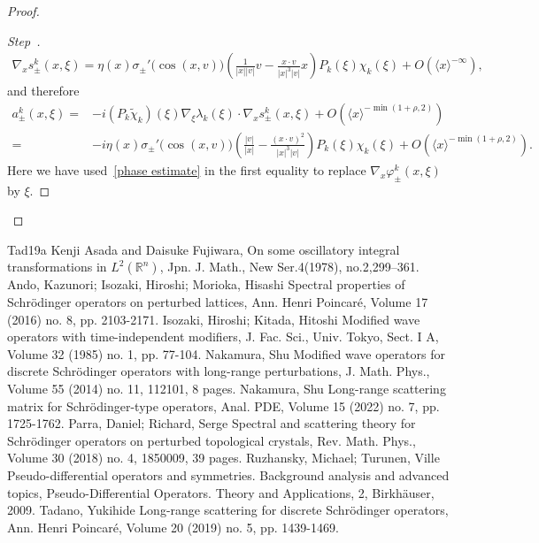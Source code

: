 \documentclass[10pt]{amsart}
\theoremstyle{definition}
\newenvironment{proofc}{\begin{proof}}{\end{proof}}
\numberwithin{equation}{section}
\newcommand{\f}{\varphi}
\newcommand{\x}{\xi}
\newcommand{\s}{\sigma}
\newcommand{\la}{\langle}
\newcommand{\ra}{\rangle}
\newcommand{\jap}[1]{\langle #1 \rangle}
\newcounter{stepcount}
\newenvironment{step}{\refstepcounter{stepcount}\begin{proof}[Step~\thestepcount]}{\let\qed\relax\end{proof}}
\begin{document}
\begin{proofc}
\begin{step}
\begin{align*}
\nabla_x s_\pm^k(x,\x) 
= \eta(x)\s_\pm'\bigl(\cos(x,v) \bigr) \left(\frac{1}{|x||v|}v - \frac{x\cdot v}{|x|^3|v|}x \right) P_k(\x) \chi_k(\x) +O\left(\jap{x}^{-\infty}\right),
\end{align*}
and therefore
\begin{align*}
a_\pm^k(x,\x) 
=& -i (P_k\tilde\chi_k)(\x)\nabla_\x \lambda_k(\x)\cdot\nabla_x s_\pm^k(x,\x) + O\left(\la x \ra^{-\min(1+\rho,2)}\right) \\
=& -i \eta(x)\s_\pm'\bigl(\cos(x,v) \bigr) \left(\frac{|v|}{|x|}-\frac{(x\cdot v)^2}{|x|^3|v|}\right) P_k(\x) \chi_k(\x) + O\left(\la x \ra^{-\min(1+\rho,2)}\right).
\end{align*}
Here we have used~\eqref{phase estimate} in the first equality to replace $\nabla_x\f_\pm^k(x,\x)$ by $\x$.\qedhere
\end{step}\let\qed\relax
\end{proofc}

\begin{thebibliography}{Tad19a}
 Kenji Asada and Daisuke Fujiwara, On some oscillatory integral transformations in $L^2(\mathbb{R}^n)$, Jpn. J. Math., New Ser.4(1978), no.2,299–361.
 Ando, Kazunori; Isozaki, Hiroshi; Morioka, Hisashi Spectral properties of Schrödinger operators on perturbed lattices, Ann. Henri Poincaré, Volume 17 (2016) no. 8, pp. 2103-2171.
 Isozaki, Hiroshi; Kitada, Hitoshi Modified wave operators with time-independent modifiers, J. Fac. Sci., Univ. Tokyo, Sect. I A, Volume 32 (1985) no. 1, pp. 77-104.
 Nakamura, Shu Modified wave operators for discrete Schrödinger operators with long-range perturbations, J. Math. Phys., Volume 55 (2014) no. 11, 112101, 8 pages.
 Nakamura, Shu Long-range scattering matrix for Schrödinger-type operators, Anal. PDE, Volume 15 (2022) no. 7, pp. 1725-1762.
 Parra, Daniel; Richard, Serge Spectral and scattering theory for Schrödinger operators on perturbed topological crystals, Rev. Math. Phys., Volume 30 (2018) no. 4, 1850009, 39 pages.
 Ruzhansky, Michael; Turunen, Ville Pseudo-differential operators and symmetries. Background analysis and advanced topics, Pseudo-Differential Operators. Theory and Applications, 2, Birkhäuser, 2009.
 Tadano, Yukihide Long-range scattering for discrete Schrödinger operators, Ann. Henri Poincaré, Volume 20 (2019) no. 5, pp. 1439-1469.
\end{thebibliography}
\end{document}
